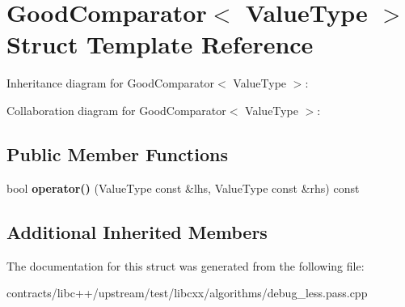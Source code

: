 \hypertarget{struct_good_comparator}{}\section{Good\+Comparator$<$ Value\+Type $>$ Struct Template Reference}
\label{struct_good_comparator}


Inheritance diagram for Good\+Comparator$<$ Value\+Type $>$\+:


Collaboration diagram for Good\+Comparator$<$ Value\+Type $>$\+:
\subsection*{Public Member Functions}
\begin{DoxyCompactItemize}
\item 
\mbox{\label{struct_good_comparator_a865ea06d803b1f252c622d379b7c5f51}} 
bool {\bfseries operator()} (Value\+Type const \&lhs, Value\+Type const \&rhs) const
\end{DoxyCompactItemize}
\subsection*{Additional Inherited Members}


The documentation for this struct was generated from the following file\+:\begin{DoxyCompactItemize}
\item 
contracts/libc++/upstream/test/libcxx/algorithms/debug\+\_\+less.\+pass.\+cpp\end{DoxyCompactItemize}
